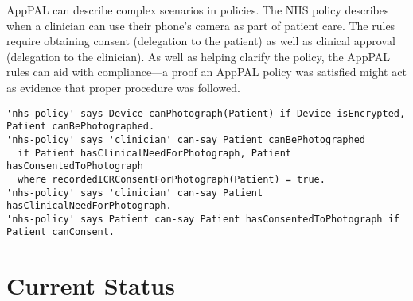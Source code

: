\documentclass{easychair}
\newcommand{\dotdotdot}[1]{$[\cdots]$}
\begin{document}
AppPAL can describe complex scenarios in policies.
The NHS policy describes when a clinician can use their phone's camera as part of patient care.
The rules require obtaining consent (delegation to the patient) as well as clinical approval (delegation to the clinician). 
As well as helping clarify the policy, the AppPAL rules can aid with compliance---a proof an AppPAL policy was satisfied might act as evidence that proper procedure was followed.
\begin{lstlisting}[title={\footnotesize\textbf{NHS}:~\itshape ``%
Some mobile devices have the ability to take photographs/videos. 
This function should not be used for photographs/videos of an individual’s care and treatment unless the device has encryption enabled and it is clinically appropriate to do so.
If the photography/video facility is used as part of the recording of an individual’s care and treatment, the device user must ensure that the consent of the individual has been collected prior to taking any photograph/video. 
\dotdotdot{The individual needs to fully understand why the photograph/video is being taken and the member of staff plans to do with it, in particular if it will be shared. }
A record of the consent must be entered into the individual’s care record.''}]
'nhs-policy' says Device canPhotograph(Patient) if Device isEncrypted, Patient canBePhotographed.
'nhs-policy' says 'clinician' can-say Patient canBePhotographed
  if Patient hasClinicalNeedForPhotograph, Patient hasConsentedToPhotograph
  where recordedICRConsentForPhotograph(Patient) = true.
'nhs-policy' says 'clinician' can-say Patient hasClinicalNeedForPhotograph.
'nhs-policy' says Patient can-say Patient hasConsentedToPhotograph if Patient canConsent.
\end{lstlisting}

\section{Current Status}
\end{document}
